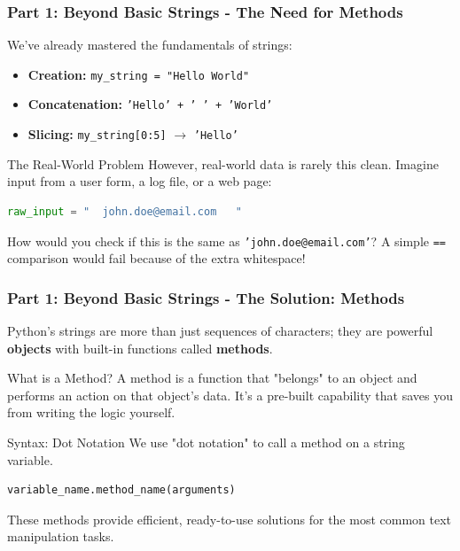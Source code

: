 \documentclass{beamer}
\begin{document}
\begin{frame}[fragile]
    \frametitle{Part 1: Beyond Basic Strings - The Need for Methods}

    We've already mastered the fundamentals of strings:
    \begin{itemize}
        \item \textbf{Creation:} \texttt{my\_string = "Hello World"}
        \item \textbf{Concatenation:} \texttt{'Hello' + ' ' + 'World'}
        \item \textbf{Slicing:} \texttt{my\_string[0:5]} $\rightarrow$ \texttt{'Hello'}
    \end{itemize}

    \vspace{1em}
    \begin{block}{The Real-World Problem}
        However, real-world data is rarely this clean. Imagine input from a user form, a log file, or a web page:
        \begin{lstlisting}[language=Python]
raw_input = "  john.doe@email.com   "
        \end{lstlisting}
        How would you check if this is the same as \texttt{'john.doe@email.com'}?
        \vspace{0.5em}
        A simple \texttt{==} comparison would fail because of the extra whitespace!
    \end{block}

\end{frame}

\begin{frame}[fragile]
    \frametitle{Part 1: Beyond Basic Strings - The Solution: Methods}

    Python's strings are more than just sequences of characters; they are powerful \textbf{objects} with built-in functions called \textbf{methods}.

    \begin{block}{What is a Method?}
        A method is a function that "belongs" to an object and performs an action on that object's data. It's a pre-built capability that saves you from writing the logic yourself.
    \end{block}

    \begin{block}{Syntax: Dot Notation}
        We use "dot notation" to call a method on a string variable.
        \begin{lstlisting}[language=Python]
variable_name.method_name(arguments)
        \end{lstlisting}
    \end{block}

    \vspace{1em}
    These methods provide efficient, ready-to-use solutions for the most common text manipulation tasks.

\end{frame}
\end{document}
